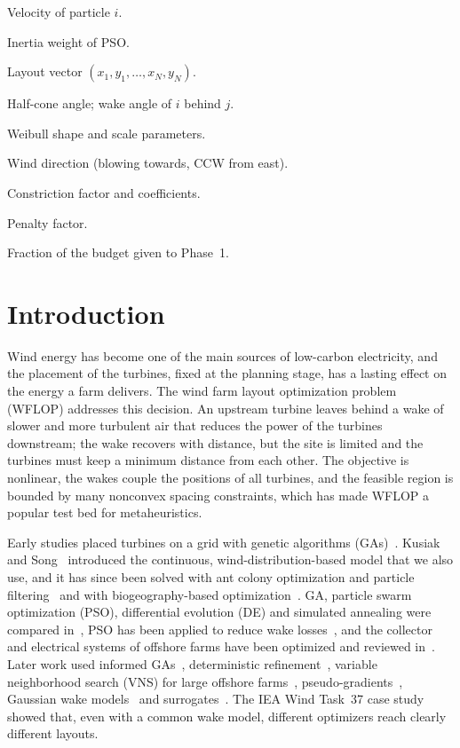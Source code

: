\documentclass[journal,twoside]{IEEEtran}
\begin{document}
\begin{IEEEdescription}
\item[$\mathbf V^i$] Velocity of particle $i$.
\item[$w$] Inertia weight of PSO.
\item[$\mathbf X$] Layout vector $(x_1,y_1,\ldots,x_N,y_N)$.
\item[$\alpha$, $\beta_{ij}$] Half-cone angle; wake angle of $i$ behind $j$.
\item[$\zeta$, $\psi$] Weibull shape and scale parameters.
\item[$\theta$] Wind direction (blowing towards, CCW from east).
\item[$\kappa$, $\varphi_{1,2}$] Constriction factor and coefficients.
\item[$\mu$] Penalty factor.
\item[$\omega$] Fraction of the budget given to Phase~1.
\end{IEEEdescription}

\section{Introduction}

Wind energy has become one of the main sources of low-carbon electricity, and the placement of the turbines, fixed at the planning stage, has a lasting effect on the energy a farm delivers. The wind farm layout optimization problem (WFLOP) addresses this decision. An upstream turbine leaves behind a wake of slower and more turbulent air that reduces the power of the turbines downstream; the wake recovers with distance, but the site is limited and the turbines must keep a minimum distance from each other. The objective is nonlinear, the wakes couple the positions of all turbines, and the feasible region is bounded by many nonconvex spacing constraints, which has made WFLOP a popular test bed for metaheuristics.

Early studies placed turbines on a grid with genetic algorithms (GAs)~\cite{Mosetti1994,Grady2005}. Kusiak and Song~\cite{Kusiak2010} introduced the continuous, wind-distribution-based model that we also use, and it has since been solved with ant colony optimization and particle filtering~\cite{Eroglu2012,Eroglu2013} and with biogeography-based optimization~\cite{Bansal2017}. GA, particle swarm optimization (PSO), differential evolution (DE) and simulated annealing were compared in~\cite{Elkinton2008}, PSO has been applied to reduce wake losses~\cite{Asaah2021}, and the collector and electrical systems of offshore farms have been optimized and reviewed in~\cite{Srikakulapu2018,Hou2019}. Later work used informed GAs~\cite{Ju2019,Bai2022}, deterministic refinement~\cite{Nagpal2021}, variable neighborhood search (VNS) for large offshore farms~\cite{Cazzaro2022}, pseudo-gradients~\cite{Quaeghebeur2021}, Gaussian wake models~\cite{Tao2020} and surrogates~\cite{Yang2023,Wang2024,Li2025}. The IEA Wind Task~37 case study~\cite{Baker2019} showed that, even with a common wake model, different optimizers reach clearly different layouts.
\end{document}
